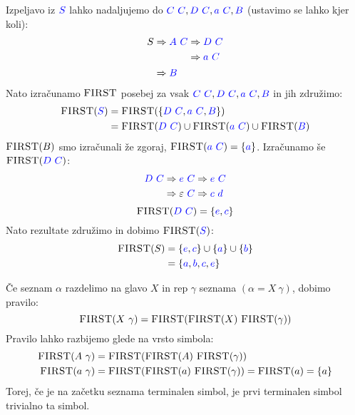 \documentclass{article}
\newcommand{\FIRST}{\textsc{FIRST}}
\newcommand{\Symbol}[1]{\textcolor{blue}{#1}}
\newcommand{\Null}{\varepsilon}
\newcommand{\Derive}{\Rightarrow}
\newcommand{\Seq}{\ }
\begin{document}
  Izpeljavo iz $\Symbol{S}$ lahko nadaljujemo do $\Symbol{C} \Seq \Symbol{C}, \Symbol{D} \Seq \Symbol{C}, \Symbol{a} \Seq \Symbol{C}, \Symbol{B}$ (ustavimo se lahko kjer koli):
  \begin{equation*}
    S \begin{aligned}[t]
      &\Derive \Symbol{A} \Seq \Symbol{C} \begin{aligned}[t]
        &\Derive \Symbol{D} \Seq \Symbol{C}\\
        &\Derive \Symbol{a} \Seq \Symbol{C}
      \end{aligned}\\
      &\Derive \Symbol{B}
    \end{aligned}
  \end{equation*}
  Nato izračunamo $\FIRST$ posebej za vsak $\Symbol{C} \Seq \Symbol{C}, \Symbol{D} \Seq \Symbol{C}, \Symbol{a} \Seq \Symbol{C}, \Symbol{B}$ in jih združimo:
  \begin{align*}
    \FIRST(\Symbol{S}) &= \FIRST(\{\Symbol{D} \Seq \Symbol{C}, \Symbol{a} \Seq \Symbol{C}, \Symbol{B}\}) \\
              &= \FIRST(\Symbol{D} \Seq \Symbol{C}) \cup \FIRST(\Symbol{a} \Seq \Symbol{C}) \cup \FIRST(\Symbol{B})
  \end{align*}
  $\FIRST(B)$ smo izračunali že zgoraj, $\FIRST(\Symbol{a} \Seq \Symbol{C}) = \{\Symbol{a}\}$.
  Izračunamo še $\FIRST(\Symbol{D} \Seq \Symbol{C})$:
  \begin{equation*}
    \Symbol{D} \Seq \Symbol{C} \begin{aligned}[t]
      &\Derive \Symbol{e} \Seq \Symbol{C} \Derive \Symbol{e} \Seq \Symbol{C} \\
      &\Derive \Null \Seq \Symbol{C} \Derive \Symbol{c} \Seq \Symbol{d} \\
    \end{aligned}
  \end{equation*}
  \begin{equation*}
    \FIRST(\Symbol{D} \Seq \Symbol{C}) = \{\Symbol{e}, \Symbol{c}\}
  \end{equation*}
  Nato rezultate združimo in dobimo $\FIRST(\Symbol{S})$:
  \begin{align*}
    \FIRST(S) &= \{\Symbol{e}, \Symbol{c}\} \cup \{\Symbol{a}\} \cup \{\Symbol{b}\} \\
              &= \{\Symbol{a}, \Symbol{b}, \Symbol{c}, \Symbol{e}\}
  \end{align*}

Če seznam $\alpha$ razdelimo na glavo $X$ in rep $\gamma$ seznama ${(\alpha = X \Seq \gamma)}$, dobimo pravilo:
\begin{equation*}
  \FIRST(X \Seq \gamma) = \FIRST(\FIRST(X) \Seq \FIRST(\gamma))
\end{equation*}
Pravilo lahko razbijemo glede na vrsto simbola:
\begin{align*}
  \FIRST(A \Seq \gamma) &= \FIRST(\FIRST(A) \Seq \FIRST(\gamma))\\
  \FIRST(a \Seq \gamma) &= \FIRST(\FIRST(a) \Seq \FIRST(\gamma)) = \FIRST(a) = \{a\}
\end{align*}
Torej, če je na začetku seznama terminalen simbol, je prvi terminalen simbol trivialno ta simbol.
\end{document}
